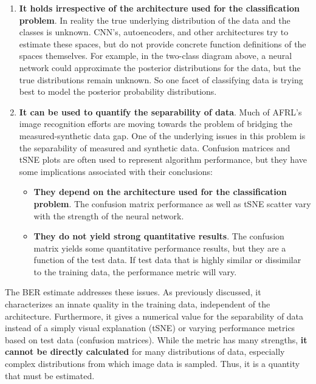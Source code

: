 \documentclass[paper=a4, fontsize=12pt]{scrartcl} %
\numberwithin{equation}{section} %
\numberwithin{figure}{section} %
\numberwithin{table}{section} %
\begin{document}
\begin{enumerate}
    \item \textbf{It holds irrespective of the architecture used for the classification problem}. In reality the 
    true underlying distribution of the data and the classes is unknown. CNN's, autoencoders, and other architectures 
    try to estimate these spaces, but do not provide concrete function definitions of the spaces themselves. For 
    example, in the two-class diagram above, a neural network could approximate the posterior distributions for the 
    data, but the true distributions remain unknown. So one facet of classifying data is trying best to model 
    the posterior probability distributions.

    \item \textbf{It can be used to quantify the separability of data}. Much of AFRL's image recognition efforts 
    are moving towards the problem of bridging the measured-synthetic data gap. One of the underlying 
    issues in this problem is the separability of measured and synthetic data. Confusion matrices and tSNE plots 
    are often used to represent algorithm performance, but they have some implications associated with their conclusions:
    \begin{itemize}
        \item \textbf{They depend on the architecture used for the classification problem}. The confusion matrix performance 
        as well as tSNE scatter vary with the strength of the neural network.

        \item \textbf{They do not yield strong quantitative results}. The confusion matrix yields some quantitative performance 
        results, but they are a function of the test data. If test data that is highly similar or dissimilar to the training 
        data, the performance metric will vary.
    \end{itemize}
\end{enumerate}
The BER estimate addresses these issues. As previously discussed, it characterizes an innate quality in the training 
data, independent of the architecture. Furthermore, it gives a numerical value for the separability of data instead of 
a simply visual explanation (tSNE) or varying performance metrics based on test data (confusion matrices). While the metric 
has many strengths, \textbf{it cannot be directly calculated} for many distributions of data, especially complex distributions 
from which image data is sampled. Thus, it is a quantity that must be estimated.
\end{document}
